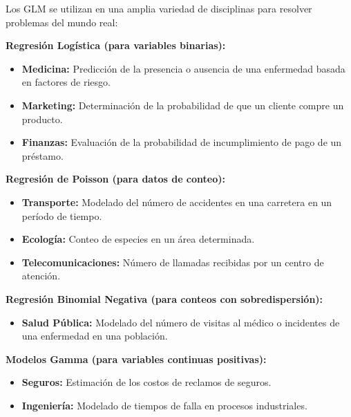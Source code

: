 \documentclass[
  letterpaper,
  DIV=11,
  numbers=noendperiod]{scrreprt}
\providecommand{\tightlist}{%
  \setlength{\itemsep}{0pt}\setlength{\parskip}{0pt}}
\begin{document}
\begin{tcolorbox}[enhanced jigsaw, breakable, toprule=.15mm, bottomtitle=1mm, coltitle=black, colbacktitle=quarto-callout-note-color!10!white, titlerule=0mm, opacitybacktitle=0.6, bottomrule=.15mm, toptitle=1mm, title=\textcolor{quarto-callout-note-color}{\faInfo}\hspace{0.5em}{Aplicaciones}, arc=.35mm, rightrule=.15mm, opacityback=0, colframe=quarto-callout-note-color-frame, leftrule=.75mm, left=2mm, colback=white]

Los GLM se utilizan en una amplia variedad de disciplinas para resolver
problemas del mundo real:

\textbf{Regresión Logística (para variables binarias):}

\begin{itemize}
\tightlist
\item
  \textbf{Medicina:} Predicción de la presencia o ausencia de una
  enfermedad basada en factores de riesgo.
\item
  \textbf{Marketing:} Determinación de la probabilidad de que un cliente
  compre un producto.
\item
  \textbf{Finanzas:} Evaluación de la probabilidad de incumplimiento de
  pago de un préstamo.
\end{itemize}

\textbf{Regresión de Poisson (para datos de conteo):}

\begin{itemize}
\tightlist
\item
  \textbf{Transporte:} Modelado del número de accidentes en una
  carretera en un período de tiempo.
\item
  \textbf{Ecología:} Conteo de especies en un área determinada.
\item
  \textbf{Telecomunicaciones:} Número de llamadas recibidas por un
  centro de atención.
\end{itemize}

\textbf{Regresión Binomial Negativa (para conteos con sobredispersión):}

\begin{itemize}
\tightlist
\item
  \textbf{Salud Pública:} Modelado del número de visitas al médico o
  incidentes de una enfermedad en una población.
\end{itemize}

\textbf{Modelos Gamma (para variables continuas positivas):}

\begin{itemize}
\tightlist
\item
  \textbf{Seguros:} Estimación de los costos de reclamos de seguros.
\item
  \textbf{Ingeniería:} Modelado de tiempos de falla en procesos
  industriales.
\end{itemize}

\end{tcolorbox}
\end{document}
